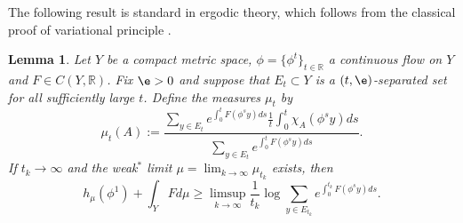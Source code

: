 \documentclass[11pt]{amsart}
\newtheorem{lemma}[theorem]{Lemma}
\theoremstyle{definition}
\def\RR{{\mathbb R}}
\begin{document}
The following result is standard in ergodic theory, which follows from the classical proof of variational principle \cite[Theorem 9.10]{W}.
\begin{lemma}\label{equilemma}
Let $Y$ be a compact metric space, $\phi=\{\phi^t\}_{t\in \RR}$ a continuous flow on $Y$ and $F\in C(Y,\RR)$. Fix $\e > 0$ and suppose that $E_t\subset Y$ is a $(t,\e)$-separated set for all sufficiently large $t$. Define the measures $\mu_t$ by
$$\mu_t(A) :=\frac{\sum_{y\in E_t}e^{\int_0^tF(\phi^sy)ds}\frac{1}{t}\int_0^t\chi_A(\phi^sy)ds}{\sum_{y\in E_t}e^{\int_0^tF(\phi^sy)ds}}.$$
If $t_k\to \infty$ and the weak$^*$ limit $\mu=\lim_{k\to \infty}\mu_{t_k}$
exists, then
$$h_\mu(\phi^1)+\int_Y Fd\mu\ge \limsup_{k\to \infty}\frac{1}{t_k}\log \sum_{y\in E_{t_k}}e^{\int_0^{t_k}F(\phi^sy)ds}.$$
\end{lemma}
\end{document}
